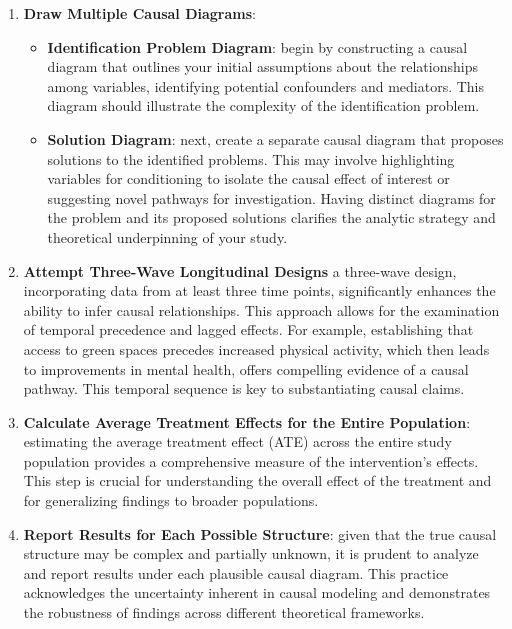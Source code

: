 \documentclass[
  singlecolumn]{article}
\providecommand{\tightlist}{%
  \setlength{\itemsep}{0pt}\setlength{\parskip}{0pt}}\usepackage{longtable,booktabs,array}
\begin{document}
\begin{enumerate}
\def\labelenumi{\arabic{enumi}.}
\item
  \textbf{Draw Multiple Causal Diagrams}:

  \begin{itemize}
  \tightlist
  \item
    \textbf{Identification Problem Diagram}: begin by constructing a
    causal diagram that outlines your initial assumptions about the
    relationships among variables, identifying potential confounders and
    mediators. This diagram should illustrate the complexity of the
    identification problem.
  \item
    \textbf{Solution Diagram}: next, create a separate causal diagram
    that proposes solutions to the identified problems. This may involve
    highlighting variables for conditioning to isolate the causal effect
    of interest or suggesting novel pathways for investigation. Having
    distinct diagrams for the problem and its proposed solutions
    clarifies the analytic strategy and theoretical underpinning of your
    study.
  \end{itemize}
\item
  \textbf{Attempt Three-Wave Longitudinal Designs} a three-wave design,
  incorporating data from at least three time points, significantly
  enhances the ability to infer causal relationships. This approach
  allows for the examination of temporal precedence and lagged effects.
  For example, establishing that access to green spaces precedes
  increased physical activity, which then leads to improvements in
  mental health, offers compelling evidence of a causal pathway. This
  temporal sequence is key to substantiating causal claims.
\item
  \textbf{Calculate Average Treatment Effects for the Entire
  Population}: estimating the average treatment effect (ATE) across the
  entire study population provides a comprehensive measure of the
  intervention's effects. This step is crucial for understanding the
  overall effect of the treatment and for generalizing findings to
  broader populations.
\item
  \textbf{Report Results for Each Possible Structure}: given that the
  true causal structure may be complex and partially unknown, it is
  prudent to analyze and report results under each plausible causal
  diagram. This practice acknowledges the uncertainty inherent in causal
  modeling and demonstrates the robustness of findings across different
  theoretical frameworks.

\end{enumerate}
\end{document}
